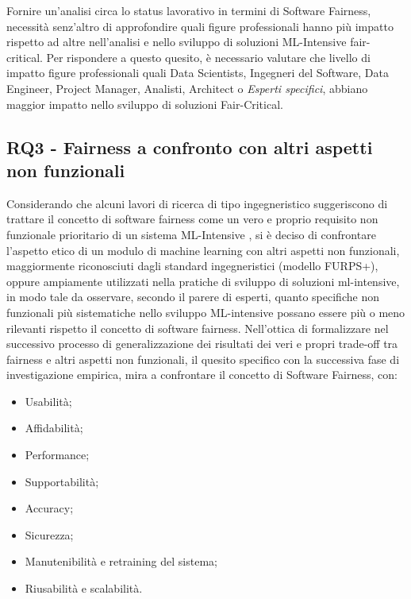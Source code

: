 	Fornire un'analisi circa lo status lavorativo in termini di Software Fairness, necessità senz'altro di approfondire quali figure professionali hanno più impatto rispetto ad altre nell'analisi e nello sviluppo di soluzioni ML-Intensive fair-critical. Per rispondere a questo quesito, è necessario valutare che livello di impatto figure professionali quali Data Scientists, Ingegneri del Software, Data Engineer, Project Manager, Analisti, Architect o \emph{Esperti specifici}, abbiano maggior impatto nello sviluppo di soluzioni Fair-Critical.\\
	
	\subsection{RQ3 - Fairness a confronto con altri aspetti non funzionali}
	\begin{center}
		\hspace*{-5mm}%
	\end{center}
	
	Considerando che alcuni lavori di ricerca di tipo ingegneristico suggeriscono di trattare il concetto di software fairness come un vero e proprio requisito non funzionale prioritario di un sistema ML-Intensive \cite{brun2018software}, si è deciso di confrontare l'aspetto etico di un modulo di machine learning con altri aspetti non funzionali, maggiormente riconosciuti dagli standard ingegneristici (modello FURPS+), oppure ampiamente utilizzati nella pratiche di sviluppo di soluzioni ml-intensive, in modo tale da osservare, secondo il parere di esperti, quanto specifiche non funzionali più sistematiche nello sviluppo ML-intensive possano essere più o meno rilevanti rispetto il concetto di software fairness. Nell'ottica di formalizzare nel successivo processo di generalizzazione dei risultati dei veri e propri trade-off tra fairness e altri aspetti non funzionali, il quesito specifico con la successiva fase di investigazione empirica, mira a confrontare il concetto di Software Fairness, con:
	
	\begin{itemize}
		\item Usabilità;
		\item Affidabilità;
		\item Performance;
		\item Supportabilità;
		\item Accuracy;
		\item Sicurezza;
		\item Manutenibilità e retraining del sistema;
		\item Riusabilità e scalabilità.
	\end{itemize}
	
